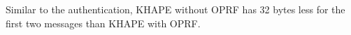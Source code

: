 \documentclass[../report.tex]{subfiles}
\begin{document}
Similar to the authentication, KHAPE without OPRF has 32 bytes less for the first two messages than KHAPE with OPRF.









\end{document}
